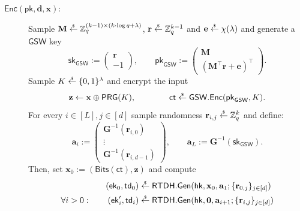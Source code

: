 \documentclass{theoretics}
\newcommand{\ek}{\mathsf{ek}}
\newcommand{\td}{\mathsf{td}}
\newcommand{\getsr}{\overset{\raisebox{-1pt}{$\scriptscriptstyle \$$}}{\gets}}
\newcommand{\sample}{\getsr}
\newcommand{\Z}{\mathbb{Z}}
\renewcommand{\sec}{\ensuremath{\lambda}}
\newcommand{\ct}{\mathsf{ct}}
\newcommand{\RTDH}{\mathsf{RTDH}}
\newcommand{\BV}{\mathsf{GSW}}
\newcommand{\algofont}[1]{\ensuremath{\mathsf{#1}}}
\newcommand{\Enc}{{\algofont{Enc}}}
\newcommand{\Gen}{{\algofont{Gen}}}
\newcommand{\pk}{{\mathsf{pk}}}
\newcommand{\sk}{{\mathsf{sk}}}
\newcommand{\hk}{\ensuremath{\mathsf{hk}}}
\newenvironment{protocol}[1][]
{\begin{algorithm}\caption{#1}}
  {\end{algorithm}}
\begin{document}
\begin{protocol}[Rate-1 Adaptive LFE for Bounded-Depth Circuits (to be continued)]
\begin{description}
\item[$\Enc(\pk, \mathbf{d}, \mathbf{x})$:] Sample $\mathbf{M}\sample\Z_q^{(k-1)\times (k\cdot \log q+\sec)}$, $\mathbf{r}\sample\Z_q^{k-1}$ and $\mathbf{e}\sample\chi(\sec)$ and generate a $\BV$ key 
\[
\sk_\BV:=\begin{pmatrix}
\mathbf r\\
-1
\end{pmatrix},
\qquad
\pk_\BV:=\begin{pmatrix}
\mathbf M\\
(\mathbf M^\intercal \mathbf r+\mathbf e)^\intercal
\end{pmatrix}.
\]
Sample $K\sample\{0, 1\}^\sec$ and encrypt the input 
\[\mathbf{z}\gets \mathbf{x}\oplus\mathsf{PRG}(K),\qquad\qquad \ct\sample\BV.\Enc(\pk_\BV, K).\]
 For every $i\in[L], j\in[d]$ sample randomness $\mathbf{r}_{i, j}\sample\Z_q^k$ and define:
\[
\mathbf{a}_i:=\begin{pmatrix}
\mathbf{G}^{-1}(\mathbf{r}_{i,0})\\
\vdots\\
\mathbf{G}^{-1}(\mathbf{r}_{i,d-1})
\end{pmatrix},
\qquad
\mathbf{a}_L:=\mathbf{G}^{-1}(\sk_\BV).
\]
Then, set $\mathbf{x}_0:=(\mathsf{Bits}(\ct), \mathbf{z})$ and compute
\begin{align*}(\ek_0, \td_0)&\sample\RTDH.\Gen(\hk, \mathbf{x}_0, \mathbf{a}_{1}; \{\mathbf{r}_{0, j}\}_{j\in[d]})\\
  \forall i>0:\qquad(\ek'_i, \td_i)&\sample\RTDH.\Gen(\hk, \mathbf{0}, \mathbf{a}_{i+1}; \{\mathbf{r}_{i, j}\}_{j\in[d]})
\end{align*}
\end{description}
\end{protocol}
\end{document}
